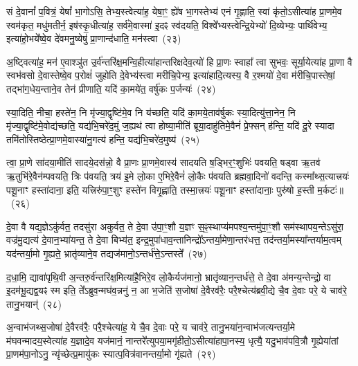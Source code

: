 सं दे॒वानां᳚ प॒वित्रं॒ येषां᳚ भा॒गो\-ऽसि॒ तेभ्य॒स्त्वेत्या॑ह॒ येषा॒ꣳ॒ ह्ये॑ष भा॒गस्तेभ्य॑ एनं गृ॒ह्णाति॒ स्वां कृ॑तो॒\-ऽसीत्या॑ह प्रा॒णमे॒व स्वम॑कृत॒ मधु॑मतीर्न॒ इष॑स्कृ॒धीत्या॑ह॒ सर्व॑मे॒वास्मा॑ इ॒दꣴ स्व॑दयति॒ विश्वे᳚भ्यस्त्वेन्द्रि॒येभ्यो॑ दि॒व्येभ्यः॒ पार्थि॑वेभ्य॒ इत्या॑हो॒भये᳚ष्वे॒व दे॑वमनु॒ष्येषु॑ प्रा॒णान्द॑धाति॒ मन॑स्त्वा~(२३)

अ॒ष्ट्वित्या॑ह॒ मन॑ ए॒वाश्ञु॑त उ॒र्व॑न्तरि॑क्ष॒मन्वि॒हीत्या॑हान्तरिक्षदेव॒त्यो॑ हि प्रा॒णः स्वाहा᳚ त्वा सुभवः॒ सूर्या॒येत्या॑ह प्रा॒णा वै स्वभ॑वसो दे॒वास्तेष्वे॒व प॒रोक्षं॑ जुहोति दे॒वेभ्य॑स्त्वा मरीचि॒पेभ्य॒ इत्या॑हादि॒त्यस्य॒ वै र॒श्मयो॑ दे॒वा म॑रीचि॒पास्तेषां॒ तद्भा॑ग॒धेय॒न्ताने॒व तेन॑ प्रीणाति॒ यदि॑ का॒मये॑त॒ वर्\mbox{}षु॑कः प॒र्जन्यः॑~(२४)

स्या॒दिति॒ नीचा॒ हस्ते॑न॒ नि मृ॑ज्या॒द्वृष्टि॑मे॒व नि य॑च्छति॒ यदि॑ का॒मये॒ताव॑र्\mbox{}षुकः स्या॒दित्यु॑त्ता॒नेन॒ नि मृ॑ज्या॒द्वृष्टि॑मे॒वोद्य॑च्छति॒ यद्य॑भि॒चरे॑द॒मुं ज॒ह्यथ॑ त्वा होष्या॒मीति॑ ब्रूया॒दाहु॑तिमे॒वैनं॑ प्रे॒फ्सन् ह॑न्ति॒ यदि॑ दू॒रे स्यादा तमि॑तोस्तिष्ठेत्प्रा॒णमे॒वास्या॑नु॒गत्य॑ हन्ति॒ यद्य॑भि॒चरे॑द॒मुष्य॑~(२५)

त्वा॒ प्रा॒णे सा॑दया॒मीति॑ सादये॒दस॑न्नो॒ वै प्रा॒णः प्रा॒णमे॒वास्य॑ सादयति ष॒ड्भिर॒ꣳ॒शुभिः॑ पवयति॒ षड्वा ऋ॒तव॑ ऋ॒तुभि॑रे॒वैन॑म्पवयति॒ त्रिः प॑वयति॒ त्रय॑ इ॒मे लो॒का ए॒भिरे॒वैनं॑ लो॒कैः प॑वयति ब्रह्मवा॒दिनो॑ वदन्ति॒ कस्मा᳚थ्स॒त्यात्त्रयः॑ पशू॒नाꣳ हस्ता॑दाना॒ इति॒ यत्त्रिरु॑पा॒ꣳ॒शुꣳ हस्ते॑न विगृ॒ह्णाति॒ तस्मा॒त्त्रयः॑ पशू॒नाꣳ हस्ता॑दानाः॒ पुरु॑षो ह॒स्ती म॒र्कटः॑॥~(२६)

{\anuvakamend[{माध्य॑न्दिनम॒ष्टाव॑ष्टावे॒ष मन॑स्त्वा प॒र्जन्यो॒\-ऽमुष्य॒ पुरु॑षो॒ द्वे च॑}]}%

दे॒वा वै यद्य॒ज्ञे\-ऽकु॑र्वत॒ तदसु॑रा अकुर्वत॒ ते दे॒वा उ॑पा॒ꣳ॒शौ य॒ज्ञꣳ स॒ꣴ॒स्थाप्य॑मपश्य॒न्तमु॑पा॒ꣳ॒शौ सम॑स्थापय॒न्ते\-ऽसु॑रा॒ वज्र॑मु॒द्यत्य॑ दे॒वान॒भ्या॑यन्त॒ ते दे॒वा बिभ्य॑त॒ इन्द्र॒मुपा॑धाव॒न्तानिन्द्रो᳚\-ऽन्तर्या॒मेणा॒न्तर॑धत्त॒ तद॑न्तर्या॒मस्या᳚न्तर्याम॒त्वम् यद॑न्तर्या॒मो गृ॒ह्यते॒ भ्रातृ॑व्याने॒व तद्यज॑मानो॒\-ऽन्तर्ध॑त्ते॒\-ऽन्तस्ते᳚~(२७)

द॒धा॒मि॒ द्यावा॑पृथि॒वी अ॒न्तरु॒र्व॑न्तरि॑क्ष॒मित्या॑है॒भिरे॒व लो॒कैर्यज॑मानो॒ भ्रातृ॑व्यान॒न्तर्ध॑त्ते॒ ते दे॒वा अ॑मन्य॒न्तेन्द्रो॒ वा इ॒दम॑भू॒द्यद्व॒यꣴ स्म इति॒ ते᳚\-ऽब्रुव॒न्मघ॑व॒न्ननु॑ न॒ आ भ॒जेति॑ स॒जोषा॑ दे॒वैरव॑रैः॒ परै॒श्चेत्य॑ब्रवी॒द्ये चै॒व दे॒वाः परे॒ ये चाव॑रे॒ तानु॒भयान्॑~(२८)

अ॒न्वाभ॑जथ्स॒जोषा॑ दे॒वैरव॑रैः॒ परै॒श्चेत्या॑ह॒ ये चै॒व दे॒वाः परे॒ य चाव॑रे॒ तानु॒भया॑न॒न्वाभ॑जत्यन्तर्या॒मे म॑घवन्मादय॒स्वेत्या॑ह य॒ज्ञादे॒व यज॑मानं॒ नान्तरे᳚त्युपया॒मगृ॑हीतो॒\-ऽसीत्या॑हापा॒नस्य॒ धृत्यै॒ यदु॒भाव॑पवि॒त्रौ गृ॒ह्येया॑तां प्रा॒णम॑पा॒नो\-ऽनु॒ न्यृ॑च्छेत्प्र॒मायु॑कः स्यात्प॒वित्र॑वानन्तर्या॒मो गृ॑ह्यते~(२९)


